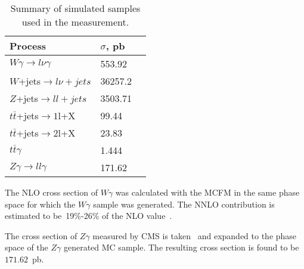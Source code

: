 
\begin{table}[h]
  \small
  \begin{center}
    \caption{Summary of simulated samples used in the measurement.}
    \begin{tabular}{|l|l|l|}
      \hline
      Process                              & $\sigma$, pb         \\ \hline
      $W\gamma \rightarrow l\nu\gamma$     & 553.92     \\ \hline         %
      $W$+jets$ \rightarrow l\nu + jets$   & 36257.2   \\  \hline %
      $Z$+jets$ \rightarrow ll + jets$     & 3503.71         \\ \hline
      $t\bar{t}$+jets$\rightarrow 1$l+X    & 99.44    \\ \hline %
      $t\bar{t}$+jets$\rightarrow 2$l+X    & 23.83         \\ \hline
      $t\bar{t}\gamma$                     & 1.444          \\ \hline
      $Z\gamma \rightarrow ll\gamma$       & 171.62           \\ \hline
    \end{tabular}
    \label{tab:mc_bkg_samples}
  \end{center}
\end{table} 

The NLO cross section of $W\gamma$ was calculated with the MCFM in the same phase space for which the $W\gamma$ sample was generated. The NNLO contribution is estimated to be~19\%-26\% of the NLO value~\cite{ref_theory_NNLO}.

The cross section of $Z\gamma$ measured by CMS is taken~\cite{ref_Zg8TeV} and expanded to the phase space of the $Z\gamma$ generated MC sample. The resulting cross section is found to be~$171.62$~pb.
